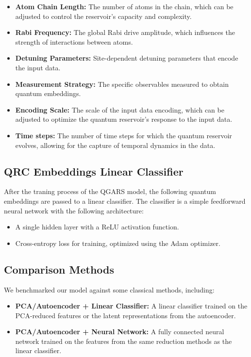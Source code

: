 \documentclass[conference]{IEEEtran}
\begin{document}
\begin{itemize}
    \item \textbf{Atom Chain Length:} 
    The number of atoms in the chain, which can be adjusted 
    to control the reservoir's capacity and complexity.
    
    \item \textbf{Rabi Frequency:} 
    The global Rabi drive amplitude, which influences the 
    strength of interactions between atoms.
    
    \item \textbf{Detuning Parameters:} 
    Site-dependent detuning parameters that encode the input data.
    
    \item \textbf{Measurement Strategy:} 
    The specific observables measured to obtain quantum embeddings.

    \item \textbf{Encoding Scale:}
    The scale of the input data encoding, which can be adjusted
    to optimize the quantum reservoir's response to the input data.

    \item \textbf{Time steps:}
    The number of time steps for which the quantum reservoir evolves,
    allowing for the capture of temporal dynamics in the data.
\end{itemize}

\subsection{QRC Embeddings Linear Classifier}
After the traning process of the QGARS model,
the following quantum embeddings are passed to a linear classifier.
The classifier is a simple feedforward neural network with the following architecture:
\begin{itemize}
    \item A single hidden layer with a ReLU activation function.
    \item Cross-entropy loss for training, optimized using the Adam optimizer.
\end{itemize}

\subsection{Comparison Methods}
We benchmarked our model against some
classical methods, including:
\begin{itemize}
    \item \textbf{PCA/Autoencoder + Linear Classifier:} 
    A linear classifier trained on the PCA-reduced features or the latent representations
    from the autoencoder.
    
    \item \textbf{PCA/Autoencoder + Neural Network:}
    A fully connected neural network trained on the features from the 
    same reduction methods as the linear classifier. 
\end{itemize}
\end{document}

